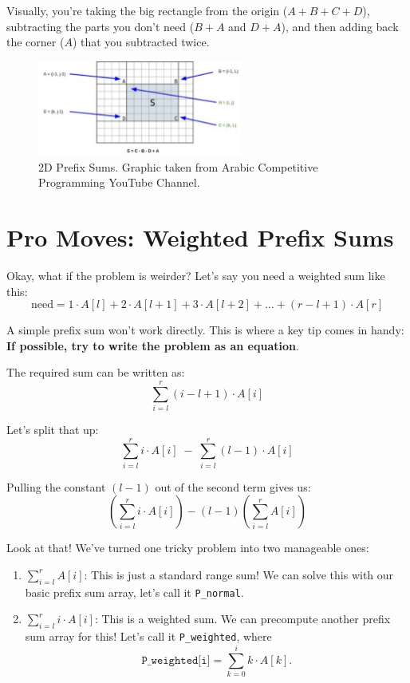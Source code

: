 Visually, you're taking the big rectangle from the origin ($A+B+C+D$), subtracting the parts you don't need ($B+A$ and $D+A$), and then adding back the corner ($A$) that you subtracted twice.

\begin{figure}
    \centering
    \includegraphics[width=0.6\textwidth]{figures/01-prefix-sums/2d_sum.png}
    \caption{2D Prefix Sums. Graphic taken from Arabic Competitive Programming YouTube Channel.}
\end{figure}

\section{Pro Moves: Weighted Prefix Sums}
Okay, what if the problem is weirder? Let's say you need a weighted sum like this:
\[
\text{need} = 1 \cdot A[l] + 2 \cdot A[l+1] + 3 \cdot A[l+2] + \dots + (r-l+1) \cdot A[r]
\]

A simple prefix sum won't work directly. This is where a key tip comes in handy: \textbf{If possible, try to write the problem as an equation}.  

The required sum can be written as:
\[
\sum_{i=l}^{r} (i-l+1) \cdot A[i]
\]

Let's split that up:
\[
\sum_{i=l}^{r} i \cdot A[i] \;-\; \sum_{i=l}^{r} (l-1) \cdot A[i]
\]

Pulling the constant $(l-1)$ out of the second term gives us:
\[
\left( \sum_{i=l}^{r} i \cdot A[i] \right) - (l-1) \left( \sum_{i=l}^{r} A[i] \right)
\]

Look at that! We've turned one tricky problem into two manageable ones:

\begin{enumerate}
    \item $\sum_{i=l}^{r} A[i]$: This is just a standard range sum! We can solve this with our basic prefix sum array, let's call it \texttt{P\_normal}.
    \item $\sum_{i=l}^{r} i \cdot A[i]$: This is a weighted sum. We can precompute another prefix sum array for this! Let's call it \texttt{P\_weighted}, where 
    \[
    \texttt{P\_weighted[i]} = \sum_{k=0}^{i} k \cdot A[k].
    \]
\end{enumerate}

